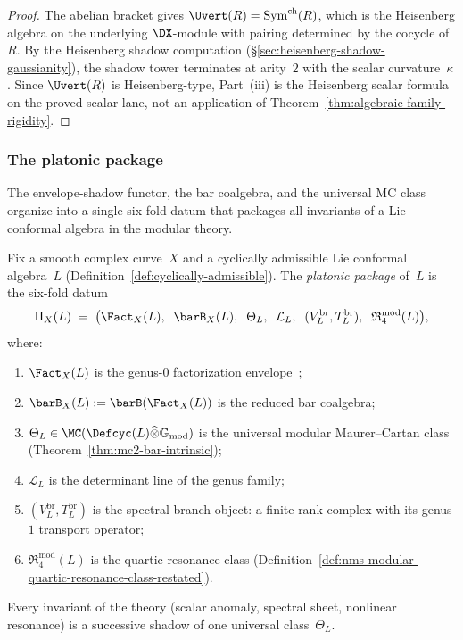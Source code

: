 \begin{proof}
The abelian bracket gives $\Uvert(R) = \mathrm{Sym}^{\mathrm{ch}}(R)$,
which is the Heisenberg algebra on the underlying $\DX$-module
with pairing determined by the cocycle of~$R$.
By the Heisenberg shadow computation
(\S\ref{sec:heisenberg-shadow-gaussianity}), the
shadow tower terminates at arity~$2$ with the scalar
curvature~$\kappa$.  Since $\Uvert(R)$ is Heisenberg-type,
Part~(iii) is the Heisenberg scalar formula on the proved
scalar lane, not an application of
Theorem~\ref{thm:algebraic-family-rigidity}.
\end{proof}

\subsubsection{The platonic package}
\label{subsubsec:platonic-package}

The envelope-shadow functor, the bar coalgebra, and the
universal MC class organize into a single six-fold datum
that packages all invariants of a Lie conformal algebra in
the modular theory.

\begin{construction}
\label{constr:platonic-package}
Fix a smooth complex curve~$X$ and a cyclically admissible Lie
conformal algebra~$L$
(Definition~\ref{def:cyclically-admissible}).
The \emph{platonic package} of~$L$ is the six-fold datum
\[
\Pi_X(L)
\;=\;
\bigl(
  \Fact_X(L),\;\;
  \barB_X(L),\;\;
  \Theta_L,\;\;
  \mathcal{L}_L,\;\;
  (V_L^{\mathrm{br}}, T_L^{\mathrm{br}}),\;\;
  \mathfrak{R}_4^{\mathrm{mod}}(L)
\bigr),
\]
where:
\begin{enumerate}[label=\textup{(\arabic*)}]
\item $\Fact_X(L)$ is the genus-$0$ factorization
  envelope~\cite{Nish26};
\item $\barB_X(L) := \barB(\Fact_X(L))$ is the reduced bar
  coalgebra;
\item $\Theta_L \in
  \MC(\Defcyc(L) \widehat\otimes \mathbb{G}_{\mathrm{mod}})$
  is the universal modular Maurer--Cartan class
  (Theorem~\ref{thm:mc2-bar-intrinsic});
\item $\mathcal{L}_L$ is the determinant line of the genus
  family;
\item $(V_L^{\mathrm{br}}, T_L^{\mathrm{br}})$ is the
  spectral branch object: a finite-rank complex with its
  genus-$1$ transport operator;
\item $\mathfrak{R}_4^{\mathrm{mod}}(L)$ is the quartic
  resonance class
  (Definition~\ref{def:nms-modular-quartic-resonance-class-restated}).
\end{enumerate}
Every invariant of the theory (scalar anomaly, spectral
sheet, nonlinear resonance) is a successive shadow of one
universal class~$\Theta_L$.
\end{construction}

